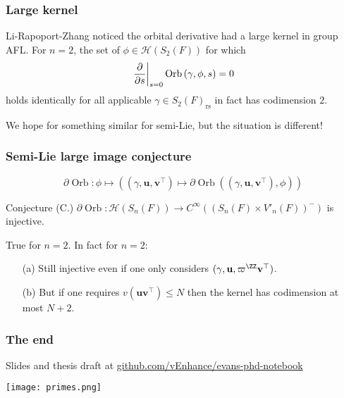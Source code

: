 \documentclass[11pt]{beamer}
\DeclareMathOperator{\Orb}{Orb}
\newcommand{\HH}{\mathcal{H}}
\newcommand{\guv}{{(\gamma, \uu, \vv^\top)}}
\newcommand{\rs}{_{\text{rs}}}
\newcommand{\uu}{\mathbf{u}}
\newcommand{\vv}{\mathbf{v}}
\begin{document}
\begin{frame}
  \frametitle{Large kernel}
  \begin{itemize}
  \ii Li-Rapoport-Zhang noticed the orbital derivative had a large kernel in group AFL.
  \ii For $n=2$, the set of $\phi \in \HH(S_2(F))$ for which
    \[ \left. \pdv{}{s} \right\rvert_{s=0} \Orb \left(\gamma, \phi, s \right) = 0 \]
    holds identically for all applicable $\gamma \in S_2(F)\rs$
    in fact has codimension $2$.
  \end{itemize}
  We hope for something similar for semi-Lie, but the situation is different!
\end{frame}
\begin{frame}
  \frametitle{Semi-Lie large image conjecture}
  \[ \partial\Orb \colon \phi \mapsto \left( \guv \mapsto \partial \Orb \left(\guv, \phi \right) \right) \]
  \begin{block}{Conjecture (C.)}
    $\partial\Orb \colon \HH(S_n(F)) \to C^\infty\left( (S_n(F) \times V'_n(F))^- \right)$
    is injective.
  \end{block}
  \begin{theorem}
    [C.]
    True for $n=2$. In fact for $n=2$:
    \begin{enumerate}
    \item[(a)] Still injective even if one only considers $(\gamma, \uu, \varpi^\ZZ \vv^\top)$.

    \item[(b)] But if one requires $v(\uu\vv^\top) \le N$
    then the kernel has codimension at most $N + 2$.
    \end{enumerate}
  \end{theorem}
\end{frame}

\begin{frame}
  \frametitle{The end}
  Slides and thesis draft at
  \href{https://github.com/vEnhance/evans-phd-notebook}{\ttfamily\color{blue} github.com/vEnhance/evans-phd-notebook}
  \begin{center}
    \texttt{[image: primes.png]}
  \end{center}
\end{frame}
\end{document}

